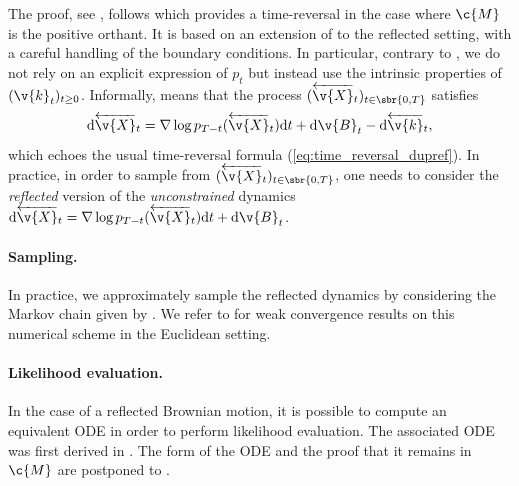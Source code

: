 The proof, see , follows \textcite{petit1997Time} which provides a time-reversal in the case where $\c{M}$ is the positive orthant.
It is based on an extension of \textcite{haussmann1986time} to the reflected setting, with a careful handling of the boundary conditions.
In particular, contrary to \textcite{petit1997Time}, we do not rely on an explicit expression of $p_t$ but instead use the intrinsic properties of $( \v{k}_t)_{t \geq 0}$.
Informally,  means that the process $(\overleftarrow{ \v{X}}_t)_{t \in \sbr{0,T}}$ satisfies \begin{equation} \label{eq:evolution_Y} \mathrm{d} \overleftarrow{ \v{X}}_t = \nabla \log p_{T-t}(\overleftarrow{ \v{X}}_t) \mathrm{d} t + \mathrm{d} \v{B}_t - \mathrm{d} \overleftarrow{ \v{k}}_t , \end{equation} which echoes the usual time-reversal formula (\ref{eq:time_reversal_dupref}).
In practice, in order to sample from $(\overleftarrow{ \v{X}}_t)_{t \in \sbr{0,T}}$, one needs to consider the \emph{reflected} version of the \emph{unconstrained} dynamics $\mathrm{d} \overleftarrow{ \v{X}}_t = \nabla \log p_{T-t}(\overleftarrow{ \v{X}}_t) \mathrm{d} t + \mathrm{d} \v{B}_t$.

\paragraph{Sampling.}
In practice, we approximately sample the reflected dynamics by considering the Markov chain given by .
We refer to \textcite{pacchiarotti1998numerical,bossy2004symmetrized} for weak convergence results on this numerical scheme in the Euclidean setting.

\paragraph{Likelihood evaluation.}
In the case of a reflected Brownian motion, it is possible to compute an equivalent ODE in order to perform likelihood evaluation.
The associated ODE was first derived in \cite{lou2023reflected}.
The form of the ODE and the proof that it remains in $\c{M}$ are postponed to .

